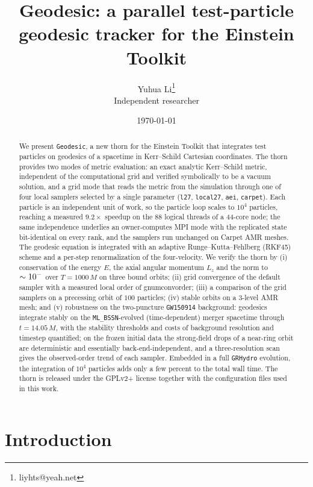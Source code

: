 \documentclass[11pt]{article}
\title{Geodesic: a parallel test-particle geodesic tracker for the Einstein Toolkit}
\author{Yuhua Li\thanks{liyhts@yeah.net} \\
{\small Independent researcher}}
\date{\today}
\newcommand{\num}[1]{\csname gnum#1\endcsname}
\begin{document}
\maketitle

\begin{abstract}
We present \texttt{Geodesic}, a new thorn for the Einstein Toolkit that
integrates test particles on geodesics of a spacetime in Kerr--Schild
Cartesian coordinates.  The thorn provides two modes of metric
evaluation: an exact analytic Kerr--Schild metric, independent of the
computational grid and verified symbolically to be a vacuum solution,
and a grid mode that reads the metric from the simulation through one
of four local samplers selected by a single parameter (\texttt{l27},
\texttt{local27}, \texttt{aei}, \texttt{carpet}).  Each particle is an
independent unit of work, so the particle loop scales to $10^4$
particles, reaching a measured $9.2\times$ speedup on the 88 logical
threads of a 44-core node; the same independence underlies an
owner-computes MPI mode with the replicated state bit-identical on
every rank, and the samplers run unchanged on Carpet AMR meshes.  The
geodesic equation is integrated with an adaptive
Runge--Kutta--Fehlberg (RKF45) scheme and a per-step renormalization of
the four-velocity.  We verify the thorn by (i) conservation of the
energy $E$, the axial angular momentum $L_z$ and the norm to
$\sim 10^{-\num{consexp}}$ over $T=1000\,M$ on three bound orbits;
(ii) grid convergence of the default sampler with a measured local
order of \num{convorder}; (iii) a comparison of the grid samplers on a
precessing orbit of $100$ particles; (iv) stable orbits on a 3-level
AMR mesh; and (v) robustness on the two-puncture \texttt{GW150914}
background: geodesics integrate stably on the \texttt{ML\_BSSN}-evolved
(time-dependent) merger spacetime through $t = 14.05\,M$, with the stability
thresholds and costs of background resolution and timestep quantified; on the
frozen initial data the strong-field drops of a near-ring orbit are
deterministic and essentially back-end-independent, and a three-resolution scan
gives the observed-order trend of each sampler.  Embedded in a full \texttt{GRHydro}
evolution, the integration of $10^4$ particles adds only a few percent
to the total wall time.  The thorn is released under the GPLv2+ license
together with the configuration files used in this work.
\end{abstract}

\section{Introduction}
\end{document}
